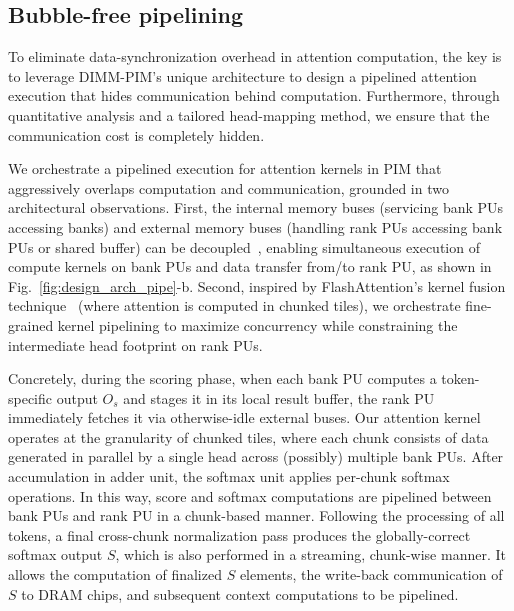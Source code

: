 \subsection{Bubble-free pipelining}
To eliminate data-synchronization overhead in attention computation, 
the key is to leverage DIMM-PIM's unique architecture to design a pipelined attention execution that hides communication behind computation. 
Furthermore, through quantitative analysis and a tailored head-mapping method, we ensure that the communication cost is completely hidden.

We orchestrate a pipelined execution for attention kernels in PIM that aggressively overlaps computation and communication, grounded in two architectural observations. 
First, the internal memory buses (servicing bank PUs accessing banks) and external memory buses (handling rank PUs accessing bank PUs or shared buffer) can be decoupled~\cite{chen2025asyncdimm}, 
enabling simultaneous execution of compute kernels on bank PUs and data transfer from/to rank PU, as shown in Fig.~\ref{fig:design_arch_pipe}-b.
Second, inspired by FlashAttention's kernel fusion technique~\cite{dao2022flashatten} (where attention is computed in chunked tiles),
we orchestrate fine-grained kernel pipelining to maximize concurrency while constraining the intermediate head footprint on rank PUs.

Concretely, during the scoring phase, 
when each bank PU computes a token-specific output $O_s$ and stages it in its local result buffer,
the rank PU immediately fetches it via otherwise-idle external buses.
Our attention kernel operates at the granularity of chunked tiles, where each chunk consists of data generated in parallel by a single head across (possibly) multiple bank PUs.
After accumulation in adder unit,
the softmax unit applies per-chunk softmax operations.
In this way, score and softmax computations are pipelined between bank PUs and rank PU in a chunk-based manner.
Following the processing of all tokens, a final cross-chunk normalization pass produces the globally-correct softmax output $S$, 
which is also performed in a streaming, chunk-wise manner.
It allows the computation of finalized $S$ elements, the write-back communication of $S$ to DRAM chips, and subsequent context computations to be pipelined.







